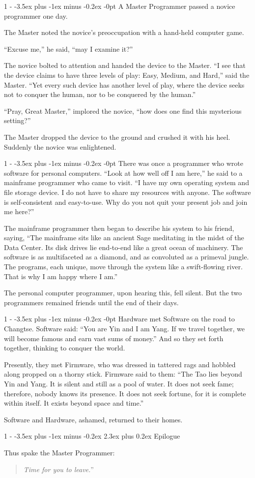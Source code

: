 \documentclass[12pt,letterpaper,titlepage]{article}
\makeatletter
\newlength{\intomargin}\setlength{\intomargin}{25pt}
\renewcommand{\section}{%
\@startsection{section}%
{1}%
{-\intomargin}%
{-3.5ex plus -1ex minus -0.2ex}%
{2.3ex plus 0.2ex}%
{\clearpage\normalfont\Large\bfseries\color{my-red}}%
}
\renewcommand{\subsection}{%
\@startsection{subsection}%
{1}%
{-\intomargin}%
{-3.5ex plus -1ex minus -0.2ex}%
{-0pt}%
{\normalfont\normalsize\bfseries\color{my-red}}%
}
\newcommand{\book}[2]{\section{#1}%
\par\hspace{-\intomargin}Thus spake the Master Programmer:%
\begin{quotation}\color{my-gray}\noindent\llap{``}\textsl{#2}''\end{quotation}\medskip}
\newcommand{\sect}{\subsection{}}
\makeatother
\begin{document}
\sect
A Master Programmer passed a novice programmer one day.

The Master noted the novice's preoccupation with a hand-held computer
game.

``Excuse me,'' he said, ``may I examine it?''

The novice bolted to attention and handed the device to the
Master. ``I see that the device claims to have three levels of play:
Easy, Medium, and Hard,'' said the Master. ``Yet every such device has
another level of play, where the device seeks not to conquer the
human, nor to be conquered by the human.''

``Pray, Great Master,'' implored the novice, ``how does one find this
mysterious setting?''

The Master dropped the device to the ground and crushed it with his
heel. Suddenly the novice was enlightened.

\sect
There was once a programmer who wrote software for personal
computers. ``Look at how well off I am here,'' he said to a mainframe
programmer who came to visit. ``I have my own operating system and
file storage device. I do not have to share my resources with
anyone. The software is self-consistent and easy-to-use. Why do you
not quit your present job and join me here?''

The mainframe programmer then began to describe his system to his
friend, saying, ``The mainframe sits like an ancient Sage meditating
in the midst of the Data Center. Its disk drives lie end-to-end like a
great ocean of machinery. The software is as multifaceted as a
diamond, and as convoluted as a primeval jungle. The programs, each
unique, move through the system like a swift-flowing river. That is
why I am happy where I am.''

The personal computer programmer, upon hearing this, fell silent. But
the two programmers remained friends until the end of their days.

\sect
Hardware met Software on the road to Changtse. Software said: ``You
are Yin and I am Yang. If we travel together, we will become famous
and earn vast sums of money.'' And so they set forth together,
thinking to conquer the world.

Presently, they met Firmware, who was dressed in tattered rags and
hobbled along propped on a thorny stick. Firmware said to them: ``The
Tao lies beyond Yin and Yang. It is silent and still as a pool of
water. It does not seek fame; therefore, nobody knows its presence. It
does not seek fortune, for it is complete within itself. It exists
beyond space and time.''

Software and Hardware, ashamed, returned to their homes.

\book{Epilogue}%
{Time for you to leave.}
\end{document}
